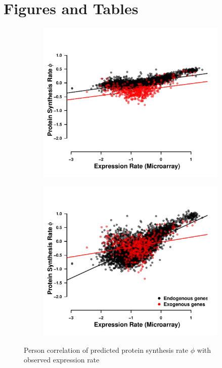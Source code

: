 \documentclass[12pt]{article}
\begin{document}



\section*{Figures and Tables}

\begin{figure}[H]
    \centering
    \begin{subfigure}
        \centering
        \includegraphics[width=.45\textwidth]{img/phi_corr_plot_whole_Genome_estim.pdf}
    \end{subfigure}
    \begin{subfigure}
        \centering
        \includegraphics[width=.45\textwidth]{img/phi_corr_plot_split_Genome_estim.pdf}
    \end{subfigure}
    \caption{Person correlation of predicted protein synthesis rate $\phi$ with observed expression rate}
    \label{fig:phi_corr_two_cond}
\end{figure}
\end{document}
